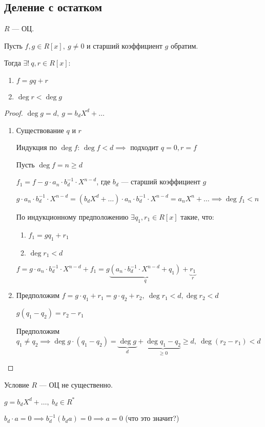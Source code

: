 \subsection{Деление с остатком}

\begin{theorem}

    $R$ --- ОЦ.
    
    Пусть $f, g \in R[x],~g \neq 0$ и старший коэффициент $g$ обратим.

    Тогда $\exists!~q, r \in R[x]$:

    \begin{enumerate}
        \item $f = gq + r$
    
        \item $\deg r < \deg g$
    \end{enumerate}
\end{theorem}

\begin{proof}
    $\deg g = d,~g = b_dX^d + \ldots$

    \begin{enumerate}
        \item Существование $q$ и $r$
        
        Индукция по $\deg f$: $\deg f < d \implies$ подходит $q = 0, r = f$

        Пусть $\deg f = n \geq d$

        $f_1 = f - g \cdot a_n \cdot b_d^{-1} \cdot X^{n-d}$, где $b_d$ --- старший коэффициент $g$

        $g \cdot a_n \cdot b_d^{-1} \cdot X^{n-d} = (b_d X^d + \ldots) \cdot a_n \cdot b_d^{-1} \cdot X^{n-d} = a_nX^n + \ldots \implies \deg f_1 < n$

        По индукционному предположению $\exists q_1, r_1 \in R[x]$ такие, что:
        \begin{enumerate}
            \item $f_1 = gq_1 + r_1$
            \item $\deg r_1 < d$
        \end{enumerate}

        $f = g \cdot a_n \cdot b_d^{-1} \cdot X^{n - d} + f_1 = g \underbrace{(a_n \cdot b_d^{-1} \cdot X^{n - d} + q_1)}_{q} + \underbrace{r_1}_{r}$


        \item Предположим $f = g \cdot q_1 + r_1 = g \cdot q_2 + r_2,~\deg r_1 < d, \deg r_2 < d$ 
        
        $g(q_1 - q_2) = r_2 - r_1$

        Предположим $q_1 \neq q_2 \implies \deg g \cdot (q_1 - q_2) = \underbrace{\deg g}_{d} + \underbrace{\deg{q_1 - q_2}}_{\geq 0} \geq d,~\deg(r_2 - r_1) < d$
    \end{enumerate}
\end{proof}

\begin{notice}
    Условие $R$ --- ОЦ не существенно.

    $g = b_d X^d + \ldots,~b_d \in R^*$

    $b_d \cdot a = 0 \implies b_d^{-1}(b_d a) = 0 \implies a = 0$ (что это значит?)
\end{notice}
